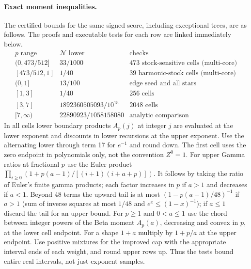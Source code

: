 \documentclass[11pt]{article}
\theoremstyle{remark}
\numberwithin{equation}{section}
\begin{document}
\paragraph{Exact moment inequalities.}
The certified bounds for the same signed score, including exceptional trees, are as follows. The proofs and executable tests for each row are linked immediately below.
\[
\begin{array}{c|c|l}
 p\text{ range}&\mathcal N\text{ lower}&\text{checks}\\ \hline
 (0,473/512]&33/1000&473\text{ stock-sensitive cells (multi-core)}\\
 {}[473/512,1]&1/40&39\text{ harmonic-stock cells (multi-core)}\\
 (0,1]&13/100&\text{edge seed and all stars}\\
 {}[1,3]&1/40&256\text{ cells}\\
 {}[3,7]&1892360505093/10^{15}&2048\text{ cells}\\
 {}[7,\infty)&22890923/1058158080&\text{analytic comparison}
\end{array}
\]
In all cells lower boundary products $A_p(j)$ at integer $j$ are evaluated at the lower exponent and discounts in lower recursions at the upper exponent. Use the alternating lower through term 17 for $e^{-1}$ and round down. The first cell uses the zero endpoint in polynomials only, not the convention $Z^0=1$. For upper Gamma ratios at fractional $p$ use the Euler product $\prod_{i\ge0}(1+p(a-1)/[(i+1)(i+a+p)])$. It follows by taking the ratio of Euler's finite gamma products; each factor increases in $p$ if $a>1$ and decreases if $a<1$. Beyond 48 terms the upward tail is at most $(1-p(a-1)/48)^{-1}$ if $a>1$ (sum of inverse squares at most $1/48$ and $e^x\le(1-x)^{-1}$); if $a\le1$ discard the tail for an upper bound. For $p\ge1$ and $0<a\le1$ use the chord between integer powers of the Beta moment $A_p(a)$, decreasing and convex in $p$, at the lower cell endpoint. For a shape $1+a$ multiply by $1+p/a$ at the upper endpoint. Use positive mixtures for the improved cap with the appropriate interval ends of each weight, and round upper rows up. Thus the tests bound entire real intervals, not just exponent samples.
\end{document}
